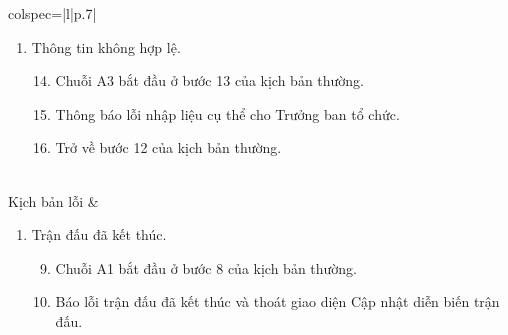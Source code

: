 \begin{longtblr}[caption = {Đặc tả usecase Cập nhật diễn biến trận đấu},
  label = {tab:usecase1-spec},]{colspec={|l|p{.7\linewidth}|}}
\begin{minipage}{\linewidth}
\begin{enumerate}[label={\textbf{\textcolor{red}{A\arabic*}} --}, align=left, itemsep=-5pt, start=2]
            \vspace{-1.5em}
            \begin{enumerate}[leftmargin=-5px, align=left, label=\arabic*.]
              \setcounter{enumii}{12}
              \item[]
                    \hspace{-25px} Chuỗi A2 bắt đầu ở bước 12 của kịch bản thường.
              \item Thông báo đã thoát giao diện Cập nhật diễn biến trận đấu.
              \item[]
                    \hspace{-25px} Trở về bước 2 của kịch bản thường.
            \end{enumerate}
      \item Thông tin không hợp lệ. \\
            \vspace{-1.5em}
            \begin{enumerate}[leftmargin=-5px, align=left, label=\arabic*.]
              \setcounter{enumii}{13}
              \item[]
                    \hspace{-25px} Chuỗi A3 bắt đầu ở bước 13 của kịch bản thường.
              \item Thông báo lỗi nhập liệu cụ thể cho Trưởng ban tổ chức.
              \item[]
                    \hspace{-25px} Trở về bước 12 của kịch bản thường.
            \end{enumerate}
    \end{enumerate}
    \vskip 1pt
  \end{minipage}
  \\\hline
  Kịch bản lỗi         &
  \begin{minipage}{\linewidth}
    \vskip 4pt
    \begin{enumerate}[label={\textbf{\textcolor{red}{A\arabic*}} --}, align=left, itemsep=-5pt]
      \item Trận đấu đã kết thúc. \\
            \vspace{-1.5em}
            \begin{enumerate}[leftmargin=-5px, align=left, label=\arabic*.]
              \setcounter{enumii}{8}
              \item[]
                    \hspace{-25px} Chuỗi A1 bắt đầu ở bước 8 của kịch bản thường.
              \item Báo lỗi trận đấu đã kết thúc và thoát giao diện Cập nhật diễn biến trận đấu.

\end{enumerate}
\end{enumerate}
\end{minipage}
\end{longtblr}
